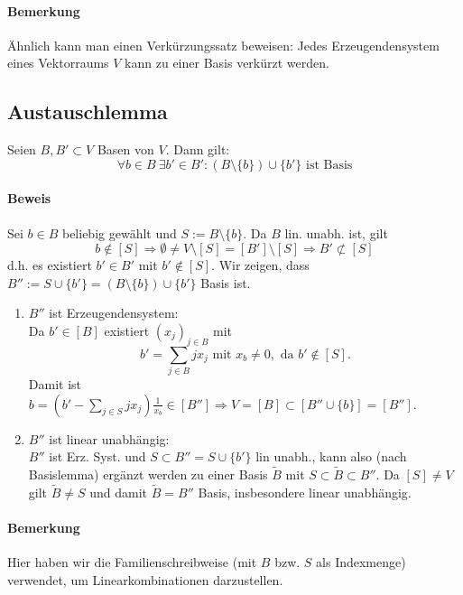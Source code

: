  	\paragraph{Bemerkung}
 		Ähnlich kann man einen Verkürzungssatz beweisen: Jedes Erzeugendensystem eines Vektorraums $V$ kann zu einer Basis verkürzt werden.

 \subsection{Austauschlemma}
 	\begin{Lemma}[Austauschlemma]
 		Seien $B,B' \subset V$ Basen von $V$. Dann gilt:
 		\[
 			\forall b\in B\ \exists b' \in B': (B\setminus\{b\})\cup\{b'\} \text{ ist Basis}
 		\]
 	\end{Lemma}

 	\paragraph{Beweis}
 		Sei $b\in B$ beliebig gewählt und $S:= B\setminus \{b\}$. Da $B$ lin. unabh. ist, gilt
 		\[
 			b\notin [S] \Rightarrow \emptyset \neq V\setminus [S] = [B']\setminus [S] \Rightarrow B' \not\subset [S]
 		\]
 		d.h. es existiert $b' \in B'$ mit $b' \notin [S]$. Wir zeigen, dass $B'' := S\cup \{b'\} = (B\setminus\{b\})\cup \{b'\}$ Basis ist.

 		\begin{enumerate}
 			\item $B''$ ist Erzeugendensystem:\\
 			      Da $b'\in [B]$ existiert $(x_j)_{j\in B}$ mit
 			      \[
 			      	b' = \sum_{j\in B} jx_j \text{ mit } x_b \neq 0, \text{ da } b' \notin [S].
 			      \]
 			      Damit ist $b=(b'-\sum_{j\in S} jx_j)\frac{1}{x_b} \in [B''] \Rightarrow V = [B] \subset [B'' \cup \{b\}] =  [B'']$.

 			\item $B''$ ist linear unabhängig:\\
 			      $B''$ ist Erz. Syst. und $S\subset B'' = S \cup \{b'\}$ lin unabh., kann also (nach Basislemma) ergänzt werden zu einer Basis $\tilde{B}$ mit $S\subset \tilde{B}\subset B''$.
 			      Da $[S] \neq V$ gilt $\tilde{B} \neq S$ und damit $\tilde{B} = B''$ Basis, insbesondere linear unabhängig.
 		\end{enumerate}

 	\paragraph{Bemerkung}
 		Hier haben wir die Familienschreibweise (mit $B$ bzw. $S$ als Indexmenge) verwendet, um Linearkombinationen darzustellen.

